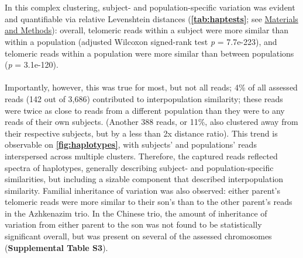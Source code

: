 \documentclass{article}
\begin{document}
    ~\\~\\
    In this complex clustering, subject- and population-specific variation was evident and quantifiable via relative Levenshtein distances
        (\textbf{\autoref{tab:haptests}}; see \hyperref[sec:methods]{Materials and Methods}):
        overall,
            telomeric reads within a subject were more similar than within a population
                (adjusted Wilcoxon signed-rank test \textit{p} = 7.7e-223),
            and telomeric reads within a population were more similar than between populations
                (\textit{p} = 3.1e-120).
        ~\\
        
        ~\\
        Importantly, however, this was true for most, but not all reads;
            4\% of all assessed reads (142 out of 3,686) contributed to interpopulation similarity;
                these reads were twice as close to reads from a different population than they were to any reads of their own subjects.
            (Another 388 reads, or 11\%, also clustered away from their respective subjects, but by a less than 2x distance ratio).
            This trend is observable on \textbf{\autoref{fig:haplotypes}},
                with subjects' and populations' reads interspersed across multiple clusters.
        Therefore, the captured reads reflected spectra of haplotypes,
            generally describing subject- and population-specific similarities,
            but including a sizable component that described interpopulation similarity.
        Familial inheritance of variation was also observed:
            either parent's telomeric reads were more similar to their son's than to the other parent's reads in the Azhkenazim trio.
            In the Chinese trio,
                the amount of inheritance of variation from either parent to the son was not found to be statistically significant overall,
                but was present on several of the assessed chromosomes (\textbf{Supplemental Table S3}).
\end{document}
